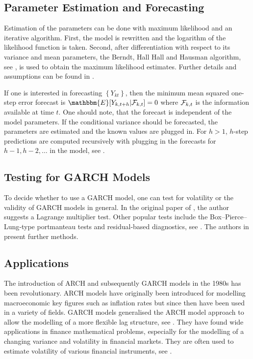 \subsection{Parameter Estimation and Forecasting}
\label{sec: GARCH Parameter Estimation and Forecasting}

Estimation of the parameters can be done with maximum likelihood and an iterative algorithm. First, the model is rewritten and the logarithm of the likelihood function is taken. Second, after differentiation with respect to its variance and mean parameters, the Berndt, Hall Hall and Hausman algorithm, see \textcite{Berndt:1974}, is used to obtain the maximum likelihood estimates. Further details and assumptions can be found in \textcite{Bollerslev:1986}. 

If one is interested in forecasting $\left\{Y_{kt}\right\}$, then the minimum mean squared one-step error forecast is $\mathbbm{E}[Y_{k,t+h}|\SigA_{k,t}]=0$ where $\mathcal{F}_{k,t}$ is the information available at time $t$. One should note, that the forecast is independent of the model parameters. If the conditional variance should be forecasted, the parameters are estimated and the known values are plugged in. For $h>1$, $h$-step predictions are computed recursively with plugging in the forecasts for $h-1,h-2,\ldots$ in the model, see \textcite{Zivot:2009}. 


\subsection{Testing for GARCH Models}
\label{sec: Testing for GARCH models}

To decide whether to use a GARCH model, one can test for volatility or the validity of GARCH models in general. In the original paper of \textcite{Bollerslev:1986}, the author suggests a Lagrange multiplier test. Other popular tests include the Box–Pierce–Lung‐type portmanteau tests and residual‐based diagnostics, see \textcite{Hong:2017}. The authors in \textcite{Hong:2017} present further methods. 


\subsection{Applications}
\label{sec: Garch Applications}

The introduction of ARCH and subsequently GARCH models in the 1980s has been revolutionary. ARCH models have originally been introduced for modelling macroeconomic key figures such as inflation rates but since then have been used in a variety of fields. GARCH models generalised the ARCH model approach to allow the modelling of a more flexible lag structure, see \textcite{Bollerslev:1986}. They have found wide applications in finance mathematical problems, especially for the modelling of a changing variance and volatility in financial markets. They are often used to estimate volatility of various financial instruments, see \textcite{Kreiss:2006}. 

